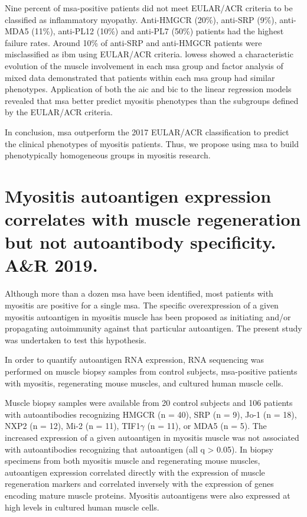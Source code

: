 Nine percent of \gls{msa}-positive patients did not meet EULAR/ACR criteria to be classified as inflammatory myopathy. Anti-HMGCR (20\%), anti-SRP (9\%), anti-MDA5 (11\%), anti-PL12 (10\%) and anti-PL7 (50\%) patients had the highest failure rates. Around 10\% of anti-SRP and anti-HMGCR patients were misclassified as \gls{ibm} using EULAR/ACR criteria. \gls{lowess} showed a characteristic evolution of the muscle involvement in each \gls{msa} group and factor analysis of mixed data demonstrated that patients within each \gls{msa} group had similar phenotypes. Application of both the \gls{aic} and \gls{bic} to the linear regression models revealed that \gls{msa} better predict myositis phenotypes than the subgroups defined by the EULAR/ACR criteria.

In conclusion, \gls{msa} outperform the 2017 EULAR/ACR classification to predict the clinical phenotypes of myositis patients. Thus, we propose using \gls{msa} to build phenotypically homogeneous groups in myositis research.


{\cleardoublepage}

\section{Myositis autoantigen expression correlates with muscle regeneration but not autoantibody specificity. A\&R 2019.}
\label{sec:autoantigens}

Although more than a dozen \gls{msa} have been identified, most patients with myositis are positive for a single \gls{msa}. The specific overexpression of a given myositis autoantigen in myositis muscle has been proposed as initiating and/or propagating autoimmunity against that particular autoantigen. The present study was undertaken to test this hypothesis.

In order to quantify autoantigen RNA expression, RNA sequencing was performed on muscle biopsy samples from control subjects, \gls{msa}-positive patients with myositis, regenerating mouse muscles, and cultured human muscle cells.

Muscle biopsy samples were available from 20 control subjects and 106 patients with autoantibodies recognizing HMGCR (n = 40), SRP (n = 9), Jo-1 (n = 18), NXP2 (n = 12), Mi-2 (n = 11), TIF1$\gamma$ (n = 11), or MDA5 (n = 5). The increased expression of a given autoantigen in myositis muscle was not associated with autoantibodies recognizing that autoantigen (all q > 0.05). In biopsy specimens from both myositis muscle and regenerating mouse muscles, autoantigen expression correlated directly with the expression of muscle regeneration markers and correlated inversely with the expression of genes encoding mature muscle proteins. Myositis autoantigens were also expressed at high levels in cultured human muscle cells.

